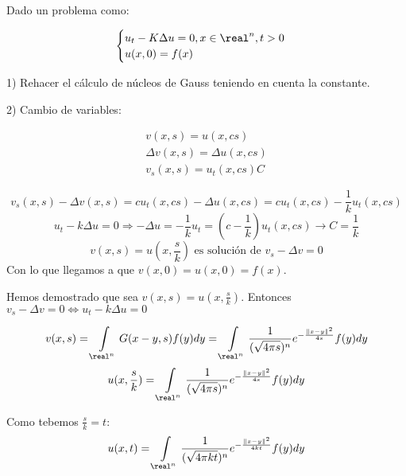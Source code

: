 Dado un problema como:

\[\begin{cases}
	u_t - K \Delta u = 0, x \in \real^n, t > 0 \\
	u(x,0) = f(x)
\end{cases}\]

1) Rehacer el cálculo de núcleos de Gauss teniendo en cuenta la constante.

2) Cambio de variables:

\begin{gather*}
	v(x,s) = u(x,cs)\\
	\Delta v(x,s) = \Delta u(x,cs)\\
	v_s(x,s) = u_t (x,cs) C
\end{gather*}

\[ v_s (x,s) - \Delta v(x,s) = c u_t (x,cs) - \Delta u(x,cs) = c u_t (x, cs) - \frac{1}{k} u_t (x,cs) \]
\[ u_t - k \Delta u = 0 \Rightarrow - \Delta u = - \frac{1}{k} u_t = (c - \frac{1}{k}) u_t(x,cs) \to C = \frac{1}{k}\]
\[ v(x,s) = u(x,\frac{s}{k}) \text{ es solución de } v_s - \Delta v = 0\]
Con lo que llegamos a que $ v(x,0) = u(x,0) = f(x)$.

Hemos demostrado que sea $v(x,s) = u(x,\frac{s}{k})$. Entonces $v_s - \Delta v = 0 \Leftrightarrow u_t - k \Delta u = 0$

\[ v(x,s) = \int\limits_{\real^n} G(x-y,s) f(y) dy = \int\limits_{\real^n} \frac{1}{(\sqrt{4\pi s})^n} e^{-\frac{\|x-y\|^2}{4s}} f(y) dy \]
\[ u(x,\frac{s}{k}) = \int\limits_{\real^n} \frac{1}{(\sqrt{4\pi s})^n} e^{-\frac{\|x-y\|^2}{4s}} f(y) dy \]

Como tebemos $\frac{s}{k} = t$:
\[ u(x,t) = \int\limits_{\real^n} \frac{1}{(\sqrt{4\pi kt})^n} e^{-\frac{\|x-y\|^2}{4kt}} f(y) dy\]





